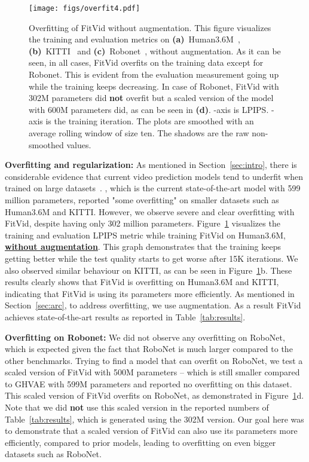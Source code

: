 \documentclass{article}
\newcommand{\model}{FitVid\xspace}
\begin{document}
\begin{figure}[t]
  \vspace{-0.5cm}
  \centering
  \texttt{[image: figs/overfit4.pdf]}
  \caption{Overfitting of \model without augmentation. 
  This figure visualizes the training and evaluation metrics on \textbf{(a)}~Human3.6M~\cite{ionescu2014human3},  \textbf{(b)}~KITTI~\cite{geiger2013vision} and \textbf{(c)}~Robonet~\cite{dasari2019robonet}, without augmentation. As it can be seen, in all cases, \model overfits on the training data except for Robonet. This is evident from the evaluation measurement going up while the training keeps decreasing. In case of Robonet, \model with 302M parameters did \textbf{not} overfit but a scaled version of the model with 600M parameters did, as can be seen in \textbf{(d)}. -axis is LPIPS. -axis is the training iteration. The plots are smoothed with an average rolling window of size ten. The shadows are the raw non-smoothed values.}
  \label{fig:overfit}
  \vspace{-0.5cm}
\end{figure}

\textbf{Overfitting and regularization:}
As mentioned in Section~\ref{sec:intro}, there is considerable evidence that current video prediction models tend to underfit when trained on large datasets~\cite{villegas2019high, castrejon2019improved, wu2021greedy}. \citet{wu2021greedy}, which is the current state-of-the-art model with 599 million parameters, reported "some overfitting" on smaller datasets such as Human3.6M and KITTI. However, we observe severe and clear overfitting with \model, despite having only 302 million parameters. 
Figure~\ref{fig:overfit} visualizes the training and evaluation LPIPS metric while training \model on Human3.6M, \textbf{\underline{without augmentation}}. This graph demonstrates that the training keeps getting better while the test quality starts to get worse after 15K iterations. We also observed similar behaviour on KITTI, as can be seen in Figure~\ref{fig:overfit}b. These results clearly shows that \model is overfitting on Human3.6M and KITTI, indicating that \model is using its parameters more efficiently. As mentioned in Section~\ref{sec:arc}, to address overfitting, we use augmentation. As a result \model achieves state-of-the-art results as reported in Table~\ref{tab:results}.

\textbf{Overfitting on Robonet:}
We did not observe any overfitting on RoboNet, which is expected given the fact that RoboNet is much larger compared to the other benchmarks. Trying to find a model that can overfit on RoboNet, we test a scaled version of \model with 500M parameters -- which is still smaller compared to GHVAE with 599M parameters and reported no overfitting on this dataset. This scaled version of \model overfits on RoboNet, as demonstrated in Figure~\ref{fig:overfit}d. Note that we did \textbf{not} use this scaled version in the reported numbers of Table~\ref{tab:results}, which is generated using the 302M version. Our goal here was to demonstrate that a scaled version of \model can also use its parameters more efficiently, compared to prior models, leading to overfitting on even bigger datasets such as RoboNet.
\end{document}
